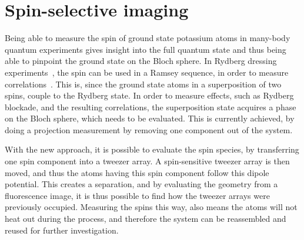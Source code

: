 \chapter{Spin-selective imaging}%
\label{ch:spin_resolved}


Being able to measure the spin of ground state potassium atoms in many-body quantum experiments gives insight into the full quantum state and thus being able to pinpoint the ground state on the Bloch sphere. In Rydberg dressing experiments~\cite{Zeiher2016, Borish2020}, the spin can be used in a Ramsey sequence, in order to measure correlations~\cite{Boll2016, Zeiher2017}.
This is, since the ground state atoms in a superposition of two spins, couple to the Rydberg state. In order to measure effects, such as Rydberg blockade, and the resulting correlations, the superposition state acquires a phase on the Bloch sphere, which needs to be evaluated. This is currently achieved, by doing a projection measurement by removing one component out of the system.

With the new approach, it is possible to evaluate the spin species, by transferring one spin component into a tweezer array. A spin-sensitive tweezer array is then moved, and thus the atoms having this spin component follow this dipole potential. This creates a separation, and by evaluating the geometry from a fluorescence image, it is thus possible to find how the tweezer arrays were previously occupied. Measuring the spins this way, also means the atoms will not heat out during the process, and therefore the system can be reassembled and reused for further investigation.


